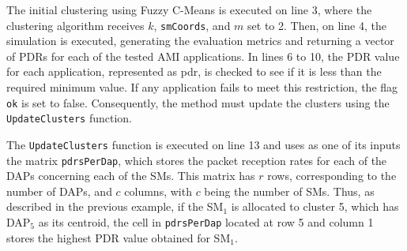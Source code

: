 \documentclass[a4paper,fleqn]{cas-dc}
\begin{document}
The initial clustering using Fuzzy C-Means is executed on line 3, where the clustering algorithm receives \texttt{\( k \)}, \texttt{smCoords}, and \texttt{\( m \)} set to 2. Then, on line 4, the simulation is executed, generating the evaluation metrics and returning a vector of PDRs for each of the tested \gls{AMI} applications. In lines 6 to 10, the \gls{PDR} value for each application, represented as pdr, is checked to see if it is less than the required minimum value. If any application fails to meet this restriction, the flag \texttt{ok} is set to false. Consequently, the method must update the clusters using the \texttt{UpdateClusters} function.

The \texttt{UpdateClusters} function is executed on line 13 and uses as one of its inputs the matrix \texttt{pdrsPerDap}, which stores the packet reception rates for each of the \gls{DAPs} concerning each of the \gls{SMs}. This matrix has \( r \) rows, corresponding to the number of \gls{DAPs}, and \( c \) columns, with \( c \) being the number of \gls{SMs}. Thus, as described in the previous example, if the SM$_{1}$ is allocated to cluster 5, which has DAP$_{5}$ as its centroid, the cell in \texttt{pdrsPerDap} located at row 5 and column 1 stores the highest PDR value obtained for SM$_{1}$.
\end{document}
